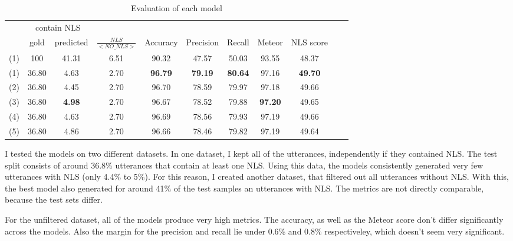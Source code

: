 \documentclass[
	11pt, %
]{fphw}
\begin{document}
\begin{table}[h]
    \centering
    \begin{tabular}{c || c c | c | c c c c c c c}
        & \multicolumn{2}{c|}{contain NLS} & & & & & & & & \\
           & gold  & predicted & $\frac{NLS}{<NO\_NLS>}$ & Accuracy       & Precision      & Recall  & Meteor        & NLS score      \\
        \hline
        (1) & 100   & 41.31     & 6.51                    & 90.32          & 47.57          & 50.03      & 93.55         & 48.37          \\
        (1) & 36.80 & 4.63      & 2.70                     & \textbf{96.79} & \textbf{79.19} & \textbf{80.64} & 97.16         & \textbf{49.70} \\
        (2) & 36.80 & 4.45      & 2.70                     & 96.70          & 78.59          & 79.97      & 97.18         & 49.66          \\
        (3) & 36.80 & \textbf{4.98}      & 2.70                     & 96.67          & 78.52          & 79.88      & \textbf{97.20} & 49.65          \\
        (4) & 36.80             & 4.63      & 2.70         & 96.69          & 78.56          & 79.93      & 97.19         & 49.66          \\
        (5) & 36.80             & 4.86      & 2.70         & 96.66          & 78.46          & 79.82      & 97.19         & 49.64
    \end{tabular}
    \caption{Evaluation of each model}
\end{table}

I tested the models on two different datasets. In one dataset, I kept all of the utterances, independently if they contained NLS. The test split consists of around 36.8\% utterances that contain at least one NLS. Using this data, the models consistently generated very few utterances with NLS (only 4.4\% to 5\%). For this reason, I created another dataset, that filtered out all utterances without NLS. With this, the best model also generated for around 41\% of the test samples an utterances with NLS. The metrics are not directly comparable, because the test sets differ. 

For the unfiltered dataset, all of the models produce very high metrics. The accuracy, as well as the Meteor score don't differ significantly across the models. Also the margin for the precision and recall lie under 0.6\% and 0.8\% respectiveley, which doesn't seem very significant. 
\end{document}
